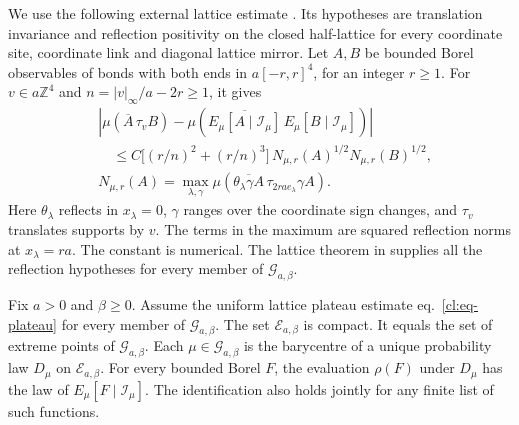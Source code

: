 \documentclass[11pt,letterpaper,reqno]{amsart}
\makeatletter
\numberwithin{equation}{section}
\renewcommand{\eqref}[1]{\textup{eq.~\ref{#1}}}
\theoremstyle{definition}
\newcommand{\ms@minorstart}{%
  \pushQED{\qed}\renewcommand{\qedsymbol}{$\blacksquare$}}
\newenvironment{proposition}[1][]{\ms@minorstart\ms@proposition[#1]}
  {\popQED\endms@proposition}
\theoremstyle{remark}
\makeatother
\begin{document}
We use the following external lattice estimate
\cite[uniform plateau estimate, Appendix~A]{Ext}.
Its hypotheses are translation invariance and reflection
positivity on the closed half-lattice for every coordinate
site, coordinate link and diagonal lattice mirror. Let
\(A,B\) be bounded Borel observables of bonds with both ends
in \(a[-r,r]^4\), for an integer \(r\ge1\). For \(v\in
a\mathbb Z^4\) and \(n=|v|_\infty/a-2r\ge1\), it gives
\begin{equation}\label{cl:eq-plateau}
 \begin{split}
 &\left|\mu(\overline A\,\tau_v B)-
    \mu\!\left(\overline{E_\mu[A\mid\mathcal I_\mu]}\,
                     E_\mu[B\mid\mathcal I_\mu]\right)\right|\\
 &\quad\le C\bigl[(r/n)^2+(r/n)^3\bigr]\,
              N_{\mu,r}(A)^{1/2}N_{\mu,r}(B)^{1/2},\\
 &N_{\mu,r}(A)=\max_{\lambda,\gamma}
      \mu\!\left(\overline{\theta_\lambda\gamma A}\,
                     \tau_{2ra e_\lambda}\gamma A\right).
 \end{split}
\end{equation}
Here \(\theta_\lambda\) reflects in \(x_\lambda=0\),
\(\gamma\) ranges over the coordinate sign changes, and
\(\tau_v\) translates supports by \(v\).
The terms in the maximum are squared reflection norms
at \(x_\lambda=ra\). The constant is numerical.
The lattice theorem in \cite[Theorem~B]{LP} supplies
all the reflection hypotheses for every member of
\(\mathcal G_{a,\beta}\).

\begin{proposition}[Ergodic Gibbs states]\label{cl:prop-fixed-pure}
Fix \(a>0\) and \(\beta\ge0\). Assume the uniform lattice
plateau estimate \eqref{cl:eq-plateau} for every member of
\(\mathcal G_{a,\beta}\).
The set \(\mathcal E_{a,\beta}\) is compact. It equals the set of
extreme points of \(\mathcal G_{a,\beta}\). Each
\(\mu\in\mathcal G_{a,\beta}\) is the barycentre of a unique
probability law \(D_\mu\) on \(\mathcal E_{a,\beta}\).
For every bounded Borel \(F\), the evaluation
\(\rho(F)\) under \(D_\mu\) has the law of
\(E_\mu[F\mid\mathcal I_\mu]\). The identification also holds
jointly for any finite list of such functions.
\end{proposition}
\end{document}

